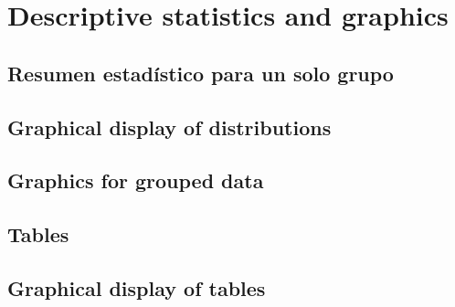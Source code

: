 \chapter{Descriptive statistics and graphics}
\section{Resumen estadístico para un solo grupo} \label{resestad}
\section{Graphical display of distributions}
\section{Graphics for grouped data}
\section{Tables} \label{tables}
\section{Graphical display of tables}

